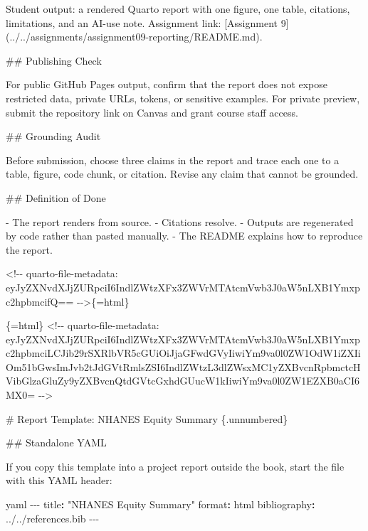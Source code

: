 \documentclass[
  letterpaper,
  DIV=11,
  numbers=noendperiod,
  oneside]{scrreprt}
\newenvironment{Shaded}{\begin{snugshade}}{\end{snugshade}}
\newcommand{\AttributeTok}[1]{\textcolor[rgb]{0.40,0.45,0.13}{#1}}
\newcommand{\CommentTok}[1]{\textcolor[rgb]{0.37,0.37,0.37}{#1}}
\newcommand{\FunctionTok}[1]{\textcolor[rgb]{0.28,0.35,0.67}{#1}}
\newcommand{\InformationTok}[1]{\textcolor[rgb]{0.37,0.37,0.37}{#1}}
\newcommand{\KeywordTok}[1]{\textcolor[rgb]{0.00,0.23,0.31}{\textbf{#1}}}
\newcommand{\NormalTok}[1]{\textcolor[rgb]{0.00,0.23,0.31}{#1}}
\newcommand{\OtherTok}[1]{\textcolor[rgb]{0.00,0.23,0.31}{#1}}
\newcommand{\PreprocessorTok}[1]{\textcolor[rgb]{0.68,0.00,0.00}{#1}}
\newcommand{\SpecialStringTok}[1]{\textcolor[rgb]{0.13,0.47,0.30}{#1}}
\newcommand{\StringTok}[1]{\textcolor[rgb]{0.13,0.47,0.30}{#1}}
\begin{document}
\begin{Shaded}
\begin{Highlighting}[numbers=left,,]
\NormalTok{Student output: a rendered Quarto report with one figure, one table, citations, limitations, and an AI{-}use note. Assignment link: }\CommentTok{[}\OtherTok{Assignment 9}\CommentTok{](../../assignments/assignment09{-}reporting/README.md)}\NormalTok{.}

\FunctionTok{\#\# Publishing Check}

\NormalTok{For public GitHub Pages output, confirm that the report does not expose restricted data, private URLs, tokens, or sensitive examples. For private preview, submit the repository link on Canvas and grant course staff access.}

\FunctionTok{\#\# Grounding Audit}

\NormalTok{Before submission, choose three claims in the report and trace each one to a table, figure, code chunk, or citation. Revise any claim that cannot be grounded.}

\FunctionTok{\#\# Definition of Done}

\SpecialStringTok{{-} }\NormalTok{The report renders from source.}
\SpecialStringTok{{-} }\NormalTok{Citations resolve.}
\SpecialStringTok{{-} }\NormalTok{Outputs are regenerated by code rather than pasted manually.}
\SpecialStringTok{{-} }\NormalTok{The README explains how to reproduce the report.}


\InformationTok{\textasciigrave{}\textless{}!{-}{-} quarto{-}file{-}metadata: eyJyZXNvdXJjZURpciI6IndlZWtzXFx3ZWVrMTAtcmVwb3J0aW5nLXB1Ymxpc2hpbmcifQ== {-}{-}\textgreater{}\textasciigrave{}}\NormalTok{\{=html\}}

\InformationTok{\textasciigrave{}\textasciigrave{}\textasciigrave{}\{=html\}}
\InformationTok{\textless{}!{-}{-} quarto{-}file{-}metadata: eyJyZXNvdXJjZURpciI6IndlZWtzXFx3ZWVrMTAtcmVwb3J0aW5nLXB1Ymxpc2hpbmciLCJib29rSXRlbVR5cGUiOiJjaGFwdGVyIiwiYm9va0l0ZW1OdW1iZXIiOm51bGwsImJvb2tJdGVtRmlsZSI6IndlZWtzL3dlZWsxMC1yZXBvcnRpbmctcHVibGlzaGluZy9yZXBvcnQtdGVtcGxhdGUucW1kIiwiYm9va0l0ZW1EZXB0aCI6MX0= {-}{-}\textgreater{}}
\InformationTok{\textasciigrave{}\textasciigrave{}\textasciigrave{}}

\FunctionTok{\# Report Template: NHANES Equity Summary \{.unnumbered\}}


\FunctionTok{\#\# Standalone YAML}

\NormalTok{If you copy this template into a project report outside the book, start the file with this YAML header:}

\InformationTok{\textasciigrave{}\textasciigrave{}\textasciigrave{}yaml}
\PreprocessorTok{{-}{-}{-}}
\FunctionTok{title}\KeywordTok{:}\AttributeTok{ }\StringTok{"NHANES Equity Summary"}
\FunctionTok{format}\KeywordTok{:}\AttributeTok{ html}
\FunctionTok{bibliography}\KeywordTok{:}\AttributeTok{ ../../references.bib}
\PreprocessorTok{{-}{-}{-}}
\InformationTok{\textasciigrave{}\textasciigrave{}\textasciigrave{}}


\end{Highlighting}
\end{Shaded}
\end{document}
